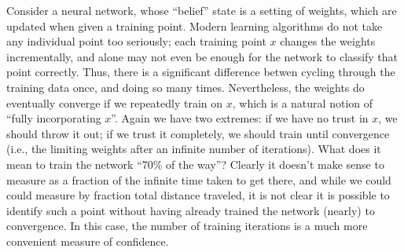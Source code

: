 Consider a neural network, whose ``belief'' state is a setting of weights,
	which are updated when given a training point.
Modern learning algorithms do not take any individual point too seriously;
each training point $x$ changes the weights incrementally, and alone may not even be enough for the network to classify that point correctly.
Thus, there is a significant difference betwen cycling through the training data once, and doing so many times.
Nevertheless, the weights do eventually converge if we repeatedly train on $x$, which is a natural notion of ``fully incorporating $x$''.
Again we have two extremes: if we have no trust in $x$, we should throw it out; if we trust it completely, we should train until convergence (i.e., the limiting weights after an infinite number of iterations). 
What does it mean to train the network ``70\% of the way''?
Clearly it doesn't make sense to measure as a fraction of the infinite time taken to get there, and while we could could measure by fraction total distance traveled, it is not clear it is possible to identify such a point without having already trained the network (nearly) to convergence. 
In this case, the number of training iterations is a much more convenient measure of confidence. 


